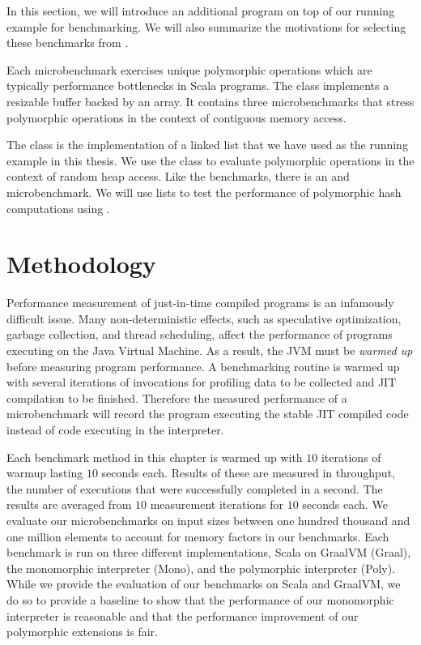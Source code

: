 In this section, we will introduce an additional program on top of our running example for benchmarking.
We will also summarize the motivations for selecting these benchmarks from \cite{scala:miniboxing}.

Each microbenchmark exercises unique polymorphic operations which are typically performance bottlenecks\cite{scala:collections-optimization,scala:dacapo} in Scala programs.
The  class implements a resizable buffer backed by an array.
It contains three microbenchmarks that stress polymorphic operations in the context of contiguous memory access.

The  class is the implementation of a linked list that we have used as the running example in this thesis.
We use the  class to evaluate polymorphic operations in the context of random heap access.
Like the  benchmarks, there is an  and  microbenchmark.
We will use lists to test the performance of polymorphic hash computations using .

\section{Methodology}

Performance measurement of just-in-time compiled programs is an infamously difficult issue\cite{java:performance-analysis,java:statistically-rigor-performance-analysis}.
Many non-deterministic effects, such as speculative optimization, garbage collection, and thread scheduling, affect the performance of programs executing on the Java Virtual Machine.
As a result, the JVM must be \textit{warmed up} before measuring program performance.
A benchmarking routine is warmed up with several iterations of invocations for profiling data to be collected and JIT compilation to be finished.
Therefore the measured performance of a microbenchmark will record the program executing the stable JIT compiled code instead of code executing in the interpreter.

Each benchmark method in this chapter is warmed up with $10$ iterations of warmup lasting $10$ seconds each.
Results of these are measured in throughput, the number of executions that were successfully completed in a second.
The results are averaged from $10$ measurement iterations for $10$ seconds each.
We evaluate our microbenchmarks on input sizes between one hundred thousand and one million elements to account for memory factors in our benchmarks. 
Each benchmark is run on three different implementations, Scala on GraalVM (Graal), the monomorphic interpreter (Mono), and the polymorphic interpreter (Poly).
While we provide the evaluation of our benchmarks on Scala and GraalVM, we do so to provide a baseline to show that the performance of our monomorphic interpreter is reasonable and that the performance improvement of our polymorphic extensions is fair.

